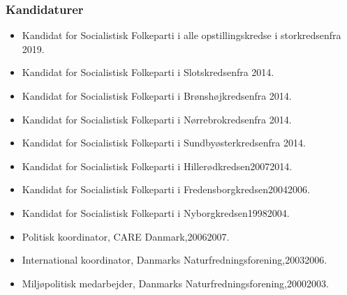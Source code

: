 \documentclass[11pt, a4paper]{awesome-cv}
\begin{document}
\begin{cvletter}
\subsubsection*{Kandidaturer}
\begin{itemize}
\item Kandidat for Socialistisk Folkeparti i alle opstillingskredse i storkredsenfra 2019.
\item Kandidat for Socialistisk Folkeparti i Slotskredsenfra 2014.
\item Kandidat for Socialistisk Folkeparti i Brønshøjkredsenfra 2014.
\item Kandidat for Socialistisk Folkeparti i Nørrebrokredsenfra 2014.
\item Kandidat for Socialistisk Folkeparti i Sundbyøsterkredsenfra 2014.
\item Kandidat for Socialistisk Folkeparti i Hillerødkredsen20072014.
\item Kandidat for Socialistisk Folkeparti i Fredensborgkredsen20042006.
\item Kandidat for Socialistisk Folkeparti i Nyborgkredsen19982004.
\end{itemize}
\begin{itemize}
\item Politisk koordinator, CARE Danmark,20062007.
\item International koordinator, Danmarks Naturfredningsforening,20032006.
\item Miljøpolitisk medarbejder, Danmarks Naturfredningsforening,20002003.
\end{itemize}
\end{cvletter}
\end{document}
